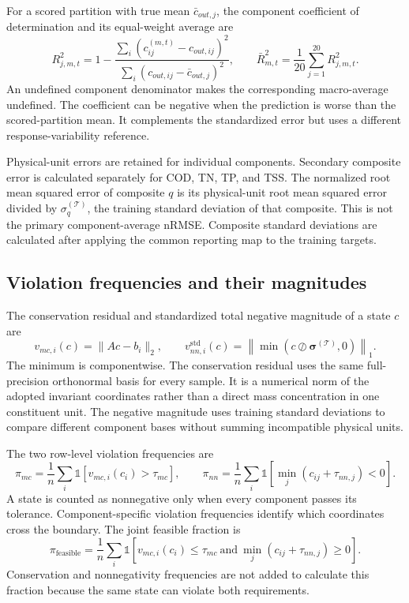 For a scored partition with true mean $\bar c_{out,j}$, the component coefficient of determination and its equal-weight average are
\begin{equation}
R_{j,m,t}^2=1-
\frac{\sum_i(c_{ij}^{(m,t)}-c_{out,ij})^2}
{\sum_i(c_{out,ij}-\bar c_{out,j})^2},\qquad
\bar R_{m,t}^2=\frac{1}{20}\sum_{j=1}^{20}R_{j,m,t}^2.
\label{eq:projection_r_squared}
\end{equation}
An undefined component denominator makes the corresponding macro-average undefined. The coefficient can be negative when the prediction is worse than the scored-partition mean. It complements the standardized error but uses a different response-variability reference.

Physical-unit errors are retained for individual components. Secondary composite error is calculated separately for COD, TN, TP, and TSS. The normalized root mean squared error of composite $q$ is its physical-unit root mean squared error divided by $\sigma_q^{(\mathcal{T})}$, the training standard deviation of that composite. This is not the primary component-average nRMSE. Composite standard deviations are calculated after applying the common reporting map to the training targets.

\subsection{Violation frequencies and their magnitudes}

The conservation residual and standardized total negative magnitude of a state $c$ are
\begin{equation}
v_{mc,i}(c)=\|Ac-b_i\|_2,\qquad
v_{nn,i}^{\mathrm{std}}(c)=
\left\|\min(c\oslash\boldsymbol{\sigma}^{(\mathcal{T})},0)\right\|_1.
\label{eq:projection_violation_magnitudes}
\end{equation}
The minimum is componentwise. The conservation residual uses the same full-precision orthonormal basis for every sample. It is a numerical norm of the adopted invariant coordinates rather than a direct mass concentration in one constituent unit. The negative magnitude uses training standard deviations to compare different component bases without summing incompatible physical units.

The two row-level violation frequencies are
\begin{equation}
\pi_{mc}=
\frac{1}{n}\sum_i\mathbb{1}[v_{mc,i}(c_i)>\tau_{mc}],\qquad
\pi_{nn}=
\frac{1}{n}\sum_i\mathbb{1}[\min_j(c_{ij}+\tau_{nn,j})<0].
\label{eq:projection_violation_rates}
\end{equation}
A state is counted as nonnegative only when every component passes its tolerance. Component-specific violation frequencies identify which coordinates cross the boundary. The joint feasible fraction is
\begin{equation}
\pi_{\mathrm{feasible}}=
\frac{1}{n}\sum_i\mathbb{1}
[v_{mc,i}(c_i)\leq\tau_{mc}\ \text{and}\ 
\min_j(c_{ij}+\tau_{nn,j})\geq0].
\label{eq:projection_feasible_fraction}
\end{equation}
Conservation and nonnegativity frequencies are not added to calculate this fraction because the same state can violate both requirements.

